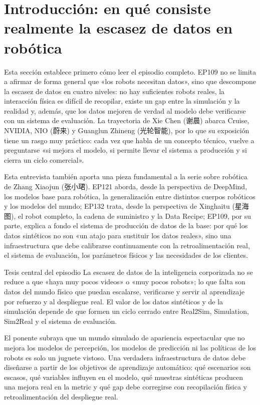 \section{Introducción: en qué consiste realmente la escasez de datos en robótica}

Esta sección establece primero cómo leer el episodio completo. EP109 no se limita a afirmar de forma general que «los robots necesitan datos», sino que descompone la escasez de datos en cuatro niveles: no hay suficientes robots reales, la interacción física es difícil de recopilar, existe un gap entre la simulación y la realidad y, además, que los datos mejoren de verdad al modelo debe verificarse con un sistema de evaluación. La trayectoria de Xie Chen (谢晨) abarca Cruise, NVIDIA, NIO (蔚来) y Guanglun Zhineng (光轮智能), por lo que su exposición tiene un rasgo muy práctico: cada vez que habla de un concepto técnico, vuelve a preguntarse «si mejora el modelo, si permite llevar el sistema a producción y si cierra un ciclo comercial».

Esta entrevista también aporta una pieza fundamental a la serie sobre robótica de Zhang Xiaojun (张小珺). EP121 aborda, desde la perspectiva de DeepMind, los modelos base para robótica, la generalización entre distintos cuerpos robóticos y los modelos del mundo; EP132 trata, desde la perspectiva de Xinghaitu (星海图), el robot completo, la cadena de suministro y la Data Recipe; EP109, por su parte, explica a fondo el sistema de producción de datos de la base: por qué los datos sintéticos no son «un atajo para sustituir los datos reales», sino una infraestructura que debe calibrarse continuamente con la retroalimentación real, el sistema de evaluación, los parámetros físicos y las necesidades de los clientes.

\begin{importantbox}{Tesis central del episodio}
La escasez de datos de la inteligencia corporizada no se reduce a que «haya muy pocos videos» o «muy pocos robots»; lo que falta son datos del mundo físico que puedan escalarse, verificarse y servir al aprendizaje por refuerzo y al despliegue real. El valor de los datos sintéticos y de la simulación depende de que formen un ciclo cerrado entre Real2Sim, Simulation, Sim2Real y el sistema de evaluación.
\end{importantbox}

El ponente subraya que un mundo simulado de apariencia espectacular que no mejora los modelos de percepción, los modelos de predicción ni las políticas de los robots es solo un juguete vistoso. Una verdadera infraestructura de datos debe diseñarse a partir de los objetivos de aprendizaje automático: qué escenarios son escasos, qué variables influyen en el modelo, qué muestras sintéticas producen una mejora real en la metric y qué gap debe corregirse con recopilación física y retroalimentación del despliegue real.

